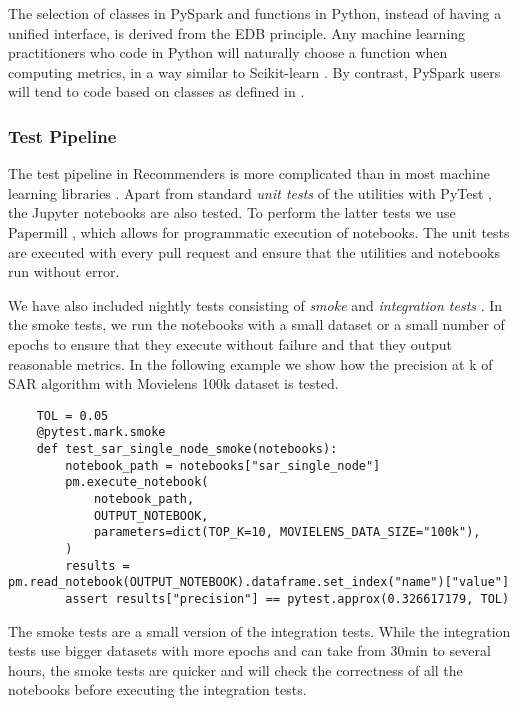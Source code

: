 The selection of classes in PySpark and functions in Python, instead of having a unified
interface, is derived from the EDB principle. Any machine learning practitioners
who code in Python will naturally choose a function when computing metrics, 
in a way similar to Scikit-learn \cite{pedregosa2011scikit}. By contrast, PySpark users 
will tend to code based on classes as defined in \cite{meng2016mllib}. 

\subsubsection{Test Pipeline}

The test pipeline in Recommenders is more complicated than in most machine learning
libraries \cite{abadi2016tensorflow,paszke2017automatic,pedregosa2011scikit,ke2017lightgbm}.
Apart from standard {\em unit tests} of the utilities with PyTest \cite{krekel2004pytest}, 
the Jupyter notebooks are also tested. To perform the latter tests we use Papermill 
\cite{nteract2017papermill}, which allows for programmatic execution of notebooks. The
unit tests are executed with every pull request and ensure that the utilities and 
notebooks run without error.

We have also included nightly tests consisting of {\em smoke} and {\em integration tests}
\cite{gonzalez-fierro2018beginners}. In the smoke tests, we run the notebooks with a 
small dataset or a small number of epochs to ensure that they execute without failure and that they 
output reasonable metrics. In the following example we show how 
the precision at k of SAR algorithm with Movielens 100k dataset is tested.

\begin{verbatim}
    TOL = 0.05
    @pytest.mark.smoke
    def test_sar_single_node_smoke(notebooks):
        notebook_path = notebooks["sar_single_node"]
        pm.execute_notebook(
            notebook_path,
            OUTPUT_NOTEBOOK,
            parameters=dict(TOP_K=10, MOVIELENS_DATA_SIZE="100k"),
        )
        results = pm.read_notebook(OUTPUT_NOTEBOOK).dataframe.set_index("name")["value"]
        assert results["precision"] == pytest.approx(0.326617179, TOL)
\end{verbatim}

The smoke tests are a small version of the integration tests. While the integration tests
use bigger datasets with more epochs and can take from 30min to several hours, the smoke tests are quicker and
will check the correctness of all the notebooks before executing the integration tests.

